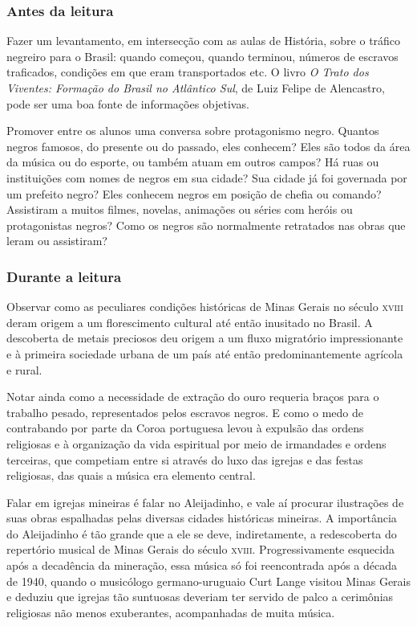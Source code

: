 \documentclass[11pt]{extarticle}
\begin{document}
\subsubsection{Antes da leitura}

Fazer um levantamento, em intersecção com as aulas de História, sobre o tráfico negreiro para o Brasil: quando
começou, quando terminou, números de escravos traficados, condições em que eram
transportados etc. O livro \emph{O Trato dos Viventes: Formação do Brasil no
Atlântico Sul}, de Luiz Felipe de Alencastro, pode ser uma boa fonte de
informações objetivas.

Promover entre os alunos uma conversa sobre protagonismo negro. Quantos negros
famosos, do presente ou do passado, eles conhecem? Eles são todos da área da
música ou do esporte, ou também atuam em outros campos? Há ruas ou instituições
com nomes de negros em sua cidade?  Sua cidade já foi governada por um prefeito
negro? Eles conhecem negros em posição de chefia ou comando? Assistiram a
muitos filmes, novelas, animações ou séries com heróis ou protagonistas negros?
Como os negros são normalmente retratados nas obras que leram ou assistiram?

\subsubsection{Durante a leitura}

  Observar como as peculiares condições históricas de Minas Gerais no século
\textsc{xviii} deram origem a um florescimento cultural até então inusitado no Brasil. A
descoberta de metais preciosos deu origem a um fluxo migratório impressionante
e à primeira sociedade urbana de um país até então predominantemente agrícola e
rural.

Notar ainda como a necessidade de extração do ouro requeria braços para o
trabalho pesado, representados pelos escravos negros. E como o medo de
contrabando por parte da Coroa portuguesa levou à expulsão das ordens
religiosas e à organização da vida espiritual por meio de irmandades e ordens
terceiras, que competiam entre si através do luxo das igrejas e das festas
religiosas, das quais a música era elemento central.

Falar em igrejas mineiras é falar no Aleijadinho, e vale aí procurar
ilustrações de suas obras espalhadas pelas diversas cidades históricas
mineiras. A importância do Aleijadinho é tão grande que a ele se deve,
indiretamente, a redescoberta do repertório musical de Minas Gerais do século
\textsc{xviii}. Progressivamente esquecida após a decadência da mineração, essa música
só foi reencontrada após a década de 1940, quando o musicólogo germano-uruguaio
Curt Lange visitou Minas Gerais e deduziu que igrejas tão suntuosas deveriam
ter servido de palco a cerimônias religiosas não menos exuberantes,
acompanhadas de muita música.
\end{document}
